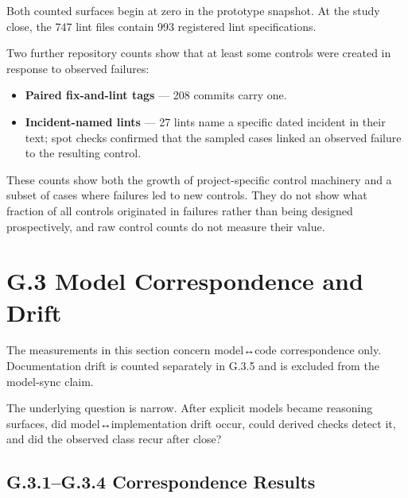 Both counted surfaces begin at zero in the prototype snapshot. At the study close, the 747 lint files contain 993 registered lint specifications.

Two further repository counts show that at least some controls were created in response to observed failures:

\begin{itemize}
\tightlist
\item
  \textbf{Paired fix-and-lint tags} --- 208 commits carry one.
\item
  \textbf{Incident-named lints} --- 27 lints name a specific dated incident in their text; spot checks confirmed that the sampled cases linked an observed failure to the resulting control.
\end{itemize}

These counts show both the growth of project-specific control machinery and a subset of cases where failures led to new controls. They do not show what fraction of all controls originated in failures rather than being designed prospectively, and raw control counts do not measure their value.


\section{G.3 Model Correspondence and Drift}\label{heading:g.3-model-correspondence-and-drift}

The measurements in this section concern model↔code correspondence only. Documentation drift is counted separately in G.3.5 and is excluded from the model-sync claim.

The underlying question is narrow. After explicit models became reasoning surfaces, did model↔implementation drift occur, could derived checks detect it, and did the observed class recur after close?

\subsection{G.3.1--G.3.4 Correspondence Results}\label{heading:model-sync-evidence}

